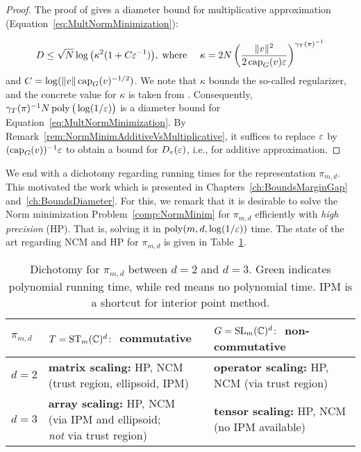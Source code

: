 \begin{proof}
	The proof of \cite[Proposition~5.5]{GradflowArXiv} gives a diameter bound for multiplicative approximation (Equation~\eqref{eq:MultNormMinimization}):
		
		\[ D \leq \sqrt{N} \log \big(\kappa^2 (1+ C \varepsilon^{-1}) \big),
		\; \text{where } \quad \kappa = 2N \left( \frac{\|v\|^2}{2 \operatorname{cap}_G(v) \varepsilon} \right)^{\gamma_T(\pi)^{-1}} \]
	and $C = \log ( \|v\| \operatorname{cap}_G(v)^{-1/2})$.
	We note that $\kappa$ bounds the so-called regularizer, and the concrete value for $\kappa$ is taken from \cite[Proposition~5.6]{GradflowArXiv}. Consequently, $\gamma_{T}(\pi)^{-1} N \operatorname{poly}\big( \log(1/\varepsilon) \big)$ is a diameter bound for Equation~\eqref{eq:MultNormMinimization}. By Remark~\ref{rem:NormMinimAdditiveVsMultiplicative}, it suffices to replace $\varepsilon$ by $(\operatorname{cap}_G(v))^{-1} \varepsilon$ to obtain a bound for $D_v(\varepsilon)$, i.e., for additive approximation.
\end{proof}

We end with a dichotomy regarding running times for the representation $\pi_{m,d}$. This motivated the work \cite{WeightMargin} which is presented in Chapters~\ref{ch:BoundsMarginGap} and~\ref{ch:BoundsDiameter}. For this, we remark that it is desirable to solve the Norm minimization Problem~\ref{comp:NormMinim} for $\pi_{m,d}$ efficiently with \emph{high precision} (HP). That is, solving it in $\operatorname{poly}(m, d, \log(1/\varepsilon))$ time. The state of the art regarding NCM and HP for $\pi_{m,d}$ is given in Table~\ref{tab:Dichotomy}.

\begin{table}[h]
	\renewcommand*{\arraystretch}{1.2}
	\begin{tabular}{ >{\centering\arraybackslash} m{1cm} ||>{\centering\arraybackslash} m{5.9cm} |>{\centering\arraybackslash} m{6.1cm}}
		$\pi_{m,d} $& $T = \operatorname{ST}_m(\mathbb C)^d \colon$ commutative & $G = \operatorname{SL}_m(\mathbb C)^d \colon$ non-commutative \\ 
		\hline \hline
		$d=2$ & \textbf{matrix scaling:} {\color{ForestGreen}HP}, {\color{ForestGreen}NCM} (trust region, ellipsoid, IPM) & \textbf{operator scaling:} {\color{ForestGreen}HP}, {\color{ForestGreen}NCM} (via trust region) \\ 
		\hline 
		$d=3$ & \makecell{ \textbf{array scaling:} {\color{ForestGreen}HP}, {\color{ForestGreen}NCM} \\ (via IPM and ellipsoid;\\ \emph{not} via trust region) }& \makecell{\textbf{tensor scaling:} {\color{red}HP}, {\color{red}NCM} \\ (no IPM available) }
	\end{tabular}
	\caption{Dichotomy for $\pi_{m,d}$ between $d=2$ and $d=3$. Green indicates polynomial running time, while red means no  polynomial time. IPM is a shortcut for interior point method.} \label{tab:Dichotomy}
\end{table}

